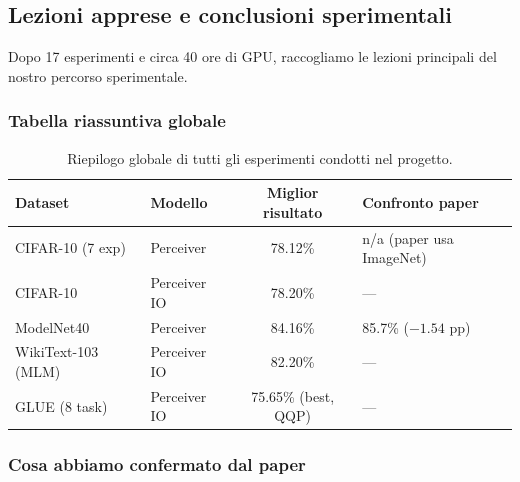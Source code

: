 \documentclass[12pt,a4paper]{article}
\begin{document}
\subsection{Lezioni apprese e conclusioni sperimentali} \label{sec:lezioni_apprese}

Dopo 17 esperimenti e circa 40 ore di GPU, raccogliamo le lezioni principali del nostro percorso sperimentale.

\subsubsection{Tabella riassuntiva globale}

\begin{table}[htbp]
\centering
\caption{Riepilogo globale di tutti gli esperimenti condotti nel progetto.}
\label{tab:riepilogo_globale}
\small
\begin{tabular}{@{}llcl@{}}
\toprule
\textbf{Dataset} & \textbf{Modello} & \textbf{Miglior risultato} & \textbf{Confronto paper} \\
\midrule
CIFAR-10 (7 exp) & Perceiver & 78.12\% & n/a (paper usa ImageNet) \\
CIFAR-10 & Perceiver IO & 78.20\% & --- \\
ModelNet40 & Perceiver & 84.16\% & 85.7\% ($-1.54$ pp) \\
WikiText-103 (MLM) & Perceiver IO & 82.20\% & --- \\
GLUE (8 task) & Perceiver IO & 75.65\% (best, QQP) & --- \\
\bottomrule
\end{tabular}
\end{table}

\subsubsection{Cosa abbiamo confermato dal paper}
\end{document}
